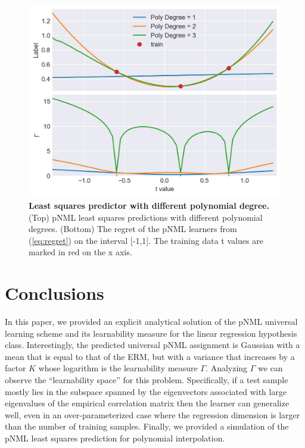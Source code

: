 \documentclass[conference,letterpaper]{IEEEtran}
\begin{document}
\begin{figure}[tb]
    \centering
    \includegraphics[width=\linewidth]{least_squares_with_poly_degree.jpg}
    \caption{\textbf{Least squares predictor with different polynomial degree.} (Top) pNML least squares predictions with different polynomial degrees. (Bottom) The regret of the pNML learners from (\ref{eq:regret}) on the interval [-1,1]. The training data t values are marked in red on the x axis.}
    \label{fig:least_squares_with_poly}
\end{figure}


\section{Conclusions} \label{sec:conclusion}

In this paper, we provided an explicit analytical solution of the pNML universal learning scheme and its learnability measure for the linear regression hypothesis class. 
Interestingly, the predicted universal pNML assignment is Gaussian with a mean that is equal to that of the ERM, but with a variance that increases by a factor $K$ whose logarithm is the learnability measure $\Gamma$.
Analyzing $\Gamma$ we can observe the ``learnability space'' for this problem. 
Specifically, if a test sample mostly lies in the subspace spanned by the eigenvectors associated with large eigenvalues of the empirical correlation matrix then the learner can generalize well, even in an over-parameterized case where the regression dimension is larger than the number of training samples.
Finally, we provided a simulation of the pNML least squares prediction for polynomial interpolation.
\end{document}
